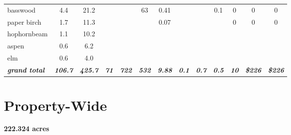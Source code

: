\documentclass[landscape]{article}
\begin{document}
\begin{table}[H]
\begin{tabular}[t]{lcccccccccccc}
basswood & 4.4 & 21.2 &  &  & 63 & 0.41 &  &  & 0.1 & 0 & 0 & 0\\
 
\rowcolor{gray!6}  paper birch & 1.7 & 11.3 &  &  &  & 0.07 &  &  &  & 0 & 0 & 0\\
 
hophornbeam & 1.1 & 10.2 &  &  &  &  &  &  &  &  &  & \\
 
\rowcolor{gray!6}  aspen & 0.6 & 6.2 &  &  &  &  &  &  &  &  &  & \\
 
elm & 0.6 & 4.0 &  &  &  &  &  &  &  &  &  & \\
 
\rowcolor{gray!6}  \rowcolor[HTML]{DCDCDC}  \em{\textbf{grand total}} & \em{\textbf{106.7}} & \em{\textbf{425.7}} & \em{\textbf{71}} & \em{\textbf{722}} & \em{\textbf{532}} & \em{\textbf{9.88}} & \em{\textbf{0.1}} & \em{\textbf{0.7}} & \em{\textbf{0.5}} & \em{\textbf{10}} & \em{\textbf{\$226}} & \em{\textbf{\$226}}\\
\bottomrule
\end{tabular}
\end{table}

\pagebreak

\section{Property-Wide}\label{property-wide}

\textbf{222.324 acres}
\end{document}
